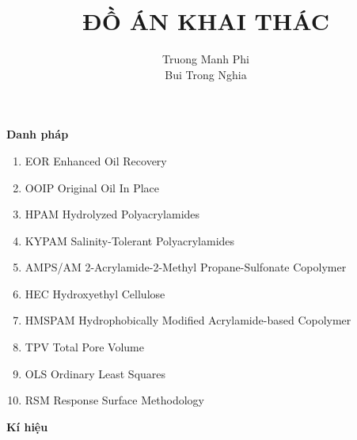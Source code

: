\documentclass[12pt,a4paper]{article}
\title{\textbf{ĐỒ ÁN KHAI THÁC}}
\author{Truong Manh Phi\\Bui Trong Nghia}
\begin{document}
\hspace*{1cm}\textbf{Danh pháp}
	\begin{enumerate}
		\item[] EOR \hspace*{50pt} Enhanced Oil Recovery
		\item[] OOIP \hspace*{45pt} Original Oil In Place
		\item[] HPAM \hspace*{39pt} Hydrolyzed Polyacrylamides
		\item[] KYPAM \hspace*{29pt} Salinity-Tolerant Polyacrylamides
		\item[] AMPS/AM \hspace*{15pt} 2-Acrylamide-2-Methyl Propane-Sulfonate Copolymer
		\item[] HEC \hspace*{47pt} Hydroxyethyl Cellulose
		\item[] HMSPAM \hspace*{19pt} Hydrophobically Modified Acrylamide-based Copolymer
		\item[] TPV \hspace*{47pt} Total Pore Volume
		\item[] OLS \hspace*{47pt} Ordinary Least Squares
		\item[] RSM \hspace*{44pt} Response Surface Methodology
	\end{enumerate}
	\newpage
\hspace*{1cm}\textbf{Kí hiệu}
\end{document}
